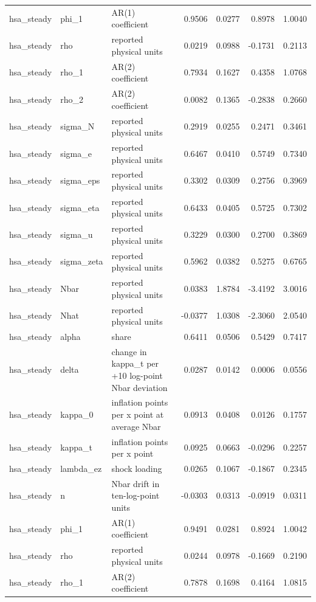 \begin{tabular}{lllrrrr}
hsa\_steady & phi\_1 & AR(1) coefficient & 0.9506 & 0.0277 & 0.8978 & 1.0040 \\
hsa\_steady & rho & reported physical units & 0.0219 & 0.0988 & -0.1731 & 0.2113 \\
hsa\_steady & rho\_1 & AR(2) coefficient & 0.7934 & 0.1627 & 0.4358 & 1.0768 \\
hsa\_steady & rho\_2 & AR(2) coefficient & 0.0082 & 0.1365 & -0.2838 & 0.2660 \\
hsa\_steady & sigma\_N & reported physical units & 0.2919 & 0.0255 & 0.2471 & 0.3461 \\
hsa\_steady & sigma\_e & reported physical units & 0.6467 & 0.0410 & 0.5749 & 0.7340 \\
hsa\_steady & sigma\_eps & reported physical units & 0.3302 & 0.0309 & 0.2756 & 0.3969 \\
hsa\_steady & sigma\_eta & reported physical units & 0.6433 & 0.0405 & 0.5725 & 0.7302 \\
hsa\_steady & sigma\_u & reported physical units & 0.3229 & 0.0300 & 0.2700 & 0.3869 \\
hsa\_steady & sigma\_zeta & reported physical units & 0.5962 & 0.0382 & 0.5275 & 0.6765 \\
hsa\_steady & Nbar & reported physical units & 0.0383 & 1.8784 & -3.4192 & 3.0016 \\
hsa\_steady & Nhat & reported physical units & -0.0377 & 1.0308 & -2.3060 & 2.0540 \\
hsa\_steady & alpha & share & 0.6411 & 0.0506 & 0.5429 & 0.7417 \\
hsa\_steady & delta & change in kappa\_t per +10 log-point Nbar deviation & 0.0287 & 0.0142 & 0.0006 & 0.0556 \\
hsa\_steady & kappa\_0 & inflation points per x point at average Nbar & 0.0913 & 0.0408 & 0.0126 & 0.1757 \\
hsa\_steady & kappa\_t & inflation points per x point & 0.0925 & 0.0663 & -0.0296 & 0.2257 \\
hsa\_steady & lambda\_ez & shock loading & 0.0265 & 0.1067 & -0.1867 & 0.2345 \\
hsa\_steady & n & Nbar drift in ten-log-point units & -0.0303 & 0.0313 & -0.0919 & 0.0311 \\
hsa\_steady & phi\_1 & AR(1) coefficient & 0.9491 & 0.0281 & 0.8924 & 1.0042 \\
hsa\_steady & rho & reported physical units & 0.0244 & 0.0978 & -0.1669 & 0.2190 \\
hsa\_steady & rho\_1 & AR(2) coefficient & 0.7878 & 0.1698 & 0.4164 & 1.0815 \\

\end{tabular}

